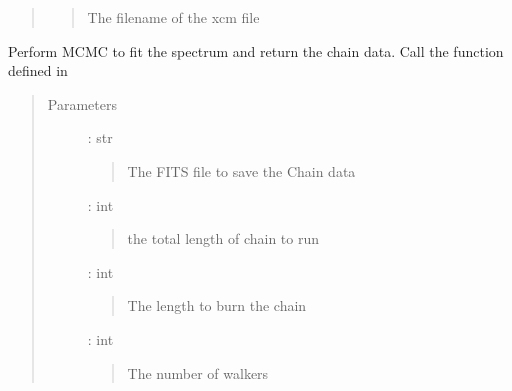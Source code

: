 \documentclass[letterpaper,10pt,english]{sphinxmanual}
\begin{document}
\begin{fulllineitems}
\begin{fulllineitems}
\begin{quote}
\begin{description}
\begin{quote}
\sphinxAtStartPar
The filename of the xcm file
\end{quote}

\end{description}\end{quote}

\end{fulllineitems}


\begin{fulllineitems}
\label{\detokenize{APIdocs/xspecanalysis:ixpetools.xspeclib.io.XspecSpec.mcmc}}
\sphinxAtStartPar
Perform MCMC to fit the spectrum and return the chain data.
Call the function defined in {\hyperref[\detokenize{APIdocs/utilities:ixpetools.utils.plot_chain.plot_corner}]{}}
\begin{quote}\begin{description}
\item[{Parameters}] \leavevmode
\sphinxAtStartPar
{} : str
\begin{quote}

\sphinxAtStartPar
The FITS file to save the Chain data
\end{quote}

\sphinxAtStartPar
{} : int
\begin{quote}

\sphinxAtStartPar
the total length of chain to run
\end{quote}

\sphinxAtStartPar
{} : int
\begin{quote}

\sphinxAtStartPar
The length to burn the chain
\end{quote}

\sphinxAtStartPar
{} : int
\begin{quote}

\sphinxAtStartPar
The number of walkers
\end{quote}


\end{description}
\end{quote}
\end{fulllineitems}
\end{fulllineitems}
\end{document}
